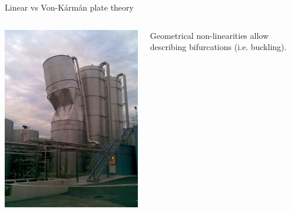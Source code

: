 \documentclass[aspectratio=169]{beamer}
\begin{document}
\begin{frame}{Linear vs Von-K\'arm\'an plate theory}

	\begin{columns}
	\begin{column}{.5\textwidth}
			\includegraphics[width=.8\columnwidth]{buckling.jpg}
	\end{column}
	\begin{column}{.5\textwidth}

		Geometrical non-linearities allow describing bifurcations (i.e. buckling).
	\end{column}
	\end{columns}
	
\end{frame}
\end{document}
